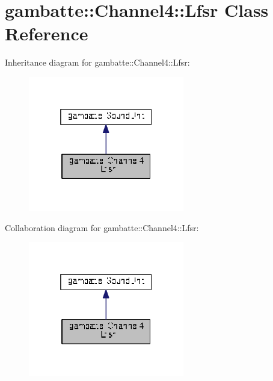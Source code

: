 \hypertarget{classgambatte_1_1Channel4_1_1Lfsr}{}\section{gambatte\+:\+:Channel4\+:\+:Lfsr Class Reference}
\label{classgambatte_1_1Channel4_1_1Lfsr}


Inheritance diagram for gambatte\+:\+:Channel4\+:\+:Lfsr\+:
\nopagebreak
\begin{figure}[H]
\begin{center}
\leavevmode
\includegraphics[width=193pt]{classgambatte_1_1Channel4_1_1Lfsr__inherit__graph}
\end{center}
\end{figure}


Collaboration diagram for gambatte\+:\+:Channel4\+:\+:Lfsr\+:
\nopagebreak
\begin{figure}[H]
\begin{center}
\leavevmode
\includegraphics[width=193pt]{classgambatte_1_1Channel4_1_1Lfsr__coll__graph}
\end{center}
\end{figure}
